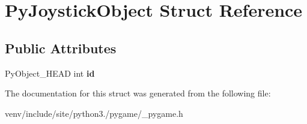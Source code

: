 \hypertarget{struct_py_joystick_object}{}\section{Py\+Joystick\+Object Struct Reference}
\label{struct_py_joystick_object}
\subsection*{Public Attributes}
\begin{DoxyCompactItemize}
\item 
\mbox{\label{struct_py_joystick_object_a424476aee95e07cb335861eb352f6afe}} 
Py\+Object\+\_\+\+H\+E\+AD int {\bfseries id}
\end{DoxyCompactItemize}


The documentation for this struct was generated from the following file\+:\begin{DoxyCompactItemize}
\item 
venv/include/site/python3./pygame/\+\_\+pygame.\+h\end{DoxyCompactItemize}
